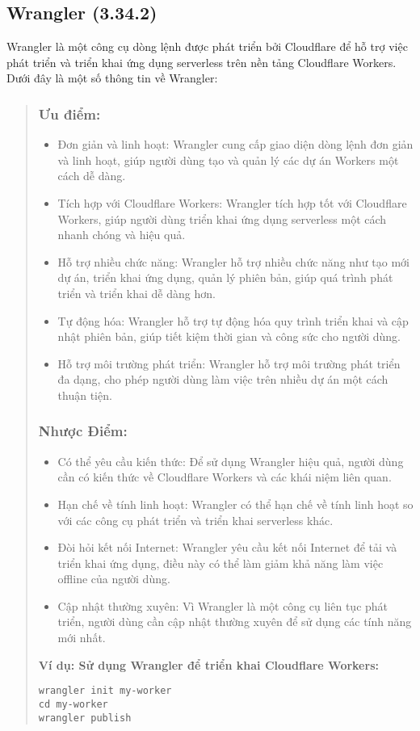\subsection{Wrangler (3.34.2)}
Wrangler là một công cụ dòng lệnh được phát triển bởi Cloudflare để hỗ trợ việc phát triển và triển khai ứng dụng serverless trên nền tảng Cloudflare Workers. Dưới đây là một số thông tin về Wrangler:

\begin{quote}
\subsubsection{Ưu điểm:}
\begin{itemize}
  \item Đơn giản và linh hoạt: Wrangler cung cấp giao diện dòng lệnh đơn giản và linh hoạt, giúp người dùng tạo và quản lý các dự án Workers một cách dễ dàng.
  \item Tích hợp với Cloudflare Workers: Wrangler tích hợp tốt với Cloudflare Workers, giúp người dùng triển khai ứng dụng serverless một cách nhanh chóng và hiệu quả.
  \item Hỗ trợ nhiều chức năng: Wrangler hỗ trợ nhiều chức năng như tạo mới dự án, triển khai ứng dụng, quản lý phiên bản, giúp quá trình phát triển và triển khai dễ dàng hơn.
  \item Tự động hóa: Wrangler hỗ trợ tự động hóa quy trình triển khai và cập nhật phiên bản, giúp tiết kiệm thời gian và công sức cho người dùng.
  \item Hỗ trợ môi trường phát triển: Wrangler hỗ trợ môi trường phát triển đa dạng, cho phép người dùng làm việc trên nhiều dự án một cách thuận tiện.
\end{itemize}

\subsubsection{Nhược Điểm:}
\begin{itemize}
  \item Có thể yêu cầu kiến thức: Để sử dụng Wrangler hiệu quả, người dùng cần có kiến thức về Cloudflare Workers và các khái niệm liên quan.
  \item Hạn chế về tính linh hoạt: Wrangler có thể hạn chế về tính linh hoạt so với các công cụ phát triển và triển khai serverless khác.
  \item Đòi hỏi kết nối Internet: Wrangler yêu cầu kết nối Internet để tải và triển khai ứng dụng, điều này có thể làm giảm khả năng làm việc offline của người dùng.
  \item Cập nhật thường xuyên: Vì Wrangler là một công cụ liên tục phát triển, người dùng cần cập nhật thường xuyên để sử dụng các tính năng mới nhất.
\end{itemize}

\textbf{Ví dụ: Sử dụng Wrangler để triển khai Cloudflare Workers:}
\begin{lstlisting}
wrangler init my-worker
cd my-worker
wrangler publish
\end{lstlisting}
\end{quote}

